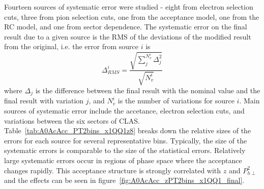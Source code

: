 \documentclass[aps,prl,twocolumn,showpacs,superscriptaddress,groupedaddress]{revtex4-1}  %
\begin{document}
Fourteen sources of systematic error were studied - eight from electron selection cuts, three from pion selection cuts, one from the acceptance model, one from the RC model, and one from sector dependence.
The systematic error on the final result due to a given source is the RMS of the deviations of the modified result from the original, i.e. the error from source $i$ is
%
\begin{equation}
\label{eq:RMS}
\Delta_{RMS}^i = \frac{\sqrt{\sum_j^{N_v^i} \Delta_j^2}}{\sqrt{N_v^i}}
\end{equation}
%
where $\Delta_j$ is the difference between the final result with the nominal value and the final result with variation $j$, and $N_v^i$ is the number of variations for source $i$.
Main sources of systematic error include the accetance, electron selection cuts, and variations between the six sectors of CLAS.
Table~\ref{tab:A0AcAcc_PT2bins_x1QQ1z8} breaks down the relative sizes of the errors for each source for several representative bins.
Typically, the size of the systematic errors is comparable to the size of the statistical errors.
Relatively large systematic errors occur in regions of phase space where the acceptance changes rapidly.
This acceptance structure is strongly correlated with $z$ and $P_{h\perp}^2$ and the effects can be seen in figure~\ref{fig:A0AcAcc_zPT2bins_x1QQ1_final}.

\end{document}

